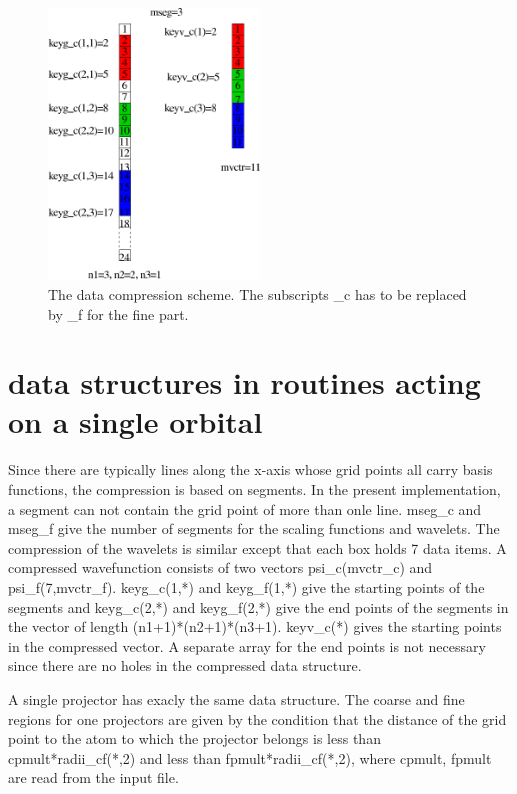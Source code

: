 \documentclass[12pt]{article}
\begin{document}
\begin{figure}[ht]             %
\begin{center}
\setlength{\unitlength}{1cm}
\includegraphics[width=0.5\textwidth]{compress.pdf}
\caption{ \label{compress} The data compression scheme. The subscripts \_c has to be replaced 
by \_f for the fine part.}
\end{center}
\end{figure}

\section{data structures in routines acting on a single orbital}
Since there are typically lines along the x-axis whose grid points all carry basis functions, 
the compression is based on segments. In the present implementation, a segment can not 
contain the grid point of more than onle line. {\color{red} mseg\_c} and 
{\color{red} mseg\_f} give the 
number of segments for the scaling functions and wavelets. The compression of the 
wavelets is similar except that each box holds 7 data items. A compressed wavefunction consists 
of two vectors {\color{red} psi\_c(mvctr\_c)} and {\color{red} psi\_f(7,mvctr\_f)}. 
{\color{red} keyg\_c(1,*)} and {\color{red} keyg\_f(1,*)}  give the starting points of the segments and
{\color{red} keyg\_c(2,*)} and {\color{red} keyg\_f(2,*)} give the end points of the segments in 
the vector of length (n1+1)*(n2+1)*(n3+1). {\color{red} keyv\_c(*)} gives the 
starting points in the compressed vector. A separate array for the end points is not 
necessary since there are no holes in the compressed data structure. 

A single projector has exacly the same data structure. The coarse and fine regions for 
one projectors are given by the condition that the distance of the grid point to 
the atom to which the projector belongs is less than  cpmult*radii\_cf(*,2) and less 
than fpmult*radii\_cf(*,2), where {\color{red} cpmult, fpmult} are read from the input file.
\end{document}
